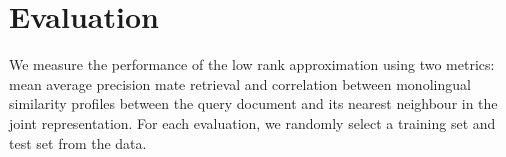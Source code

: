 \documentclass{article} %
\begin{document}
\begin{comment}
To investigate the empirical performance of the low rank
approximations we will test the algorithms on two large-scale,
real-world multilingual datasets: European Parliament Proceedings
Parallel Corpus v6 (EuroParl)\cite{europarl,euro_parl_web} and
Wikipedia~\cite{wikipedia}. Both sources offer a large number of
comparable documents in multiple languages.

EuroParl provides documents on legislation, regulations,
parliamentary sessions, etc.  in 21 of the EU languages and is a
\emph{gold standard} in terms of multi-lingual data: these
documents are professional translations of each other.  In the
corpus, each day is available as a separate file, although newer
data is available in smaller units. To create the document,
within each file, we create a document for each speech
ID\footnote{In the corpus, this is referred to as the speaker
  ID.}(so each speech is a document). In the end, the document
contains a document ID, a speech ID, and paragraph markup. The
documents were aligned in two ways: by speaker id and by
paragraphs.  The number of paragraphs was used only if the number
was the same for different languages.  In total, it contains
approximately 21000 documents in the 21 languages of the EU
taking up around 2GB od storage.

Wikipedia is the de-facto encyclopedia on the Internet and can be
downloaded freely. It contains 15 million articles in around 200
languages.The distribution of these articles is not uniform but
heavily biased towards a few languages. The top 3 languages
(English, German, French) contain more than 1 million articles;
the next 6 (Spanish, Italian, Dutch, Japanese, Polish, Portuguese
and Russian) contain more than 650,000 articles; down to Karuni
with 1 article. To make the two dataset comparable, we select the
same languages as above with a similar number of
documents\footnote{Of the chosen languages, Latvian had the
  fewest articles with 37,000 articles}.


\end{comment}

\section{Evaluation}
We measure the performance of the low rank approximation using
two metrics: mean average precision mate retrieval and
correlation between monolingual similarity profiles between the
query document and its nearest neighbour in the joint
representation. For each evaluation, we randomly select a
training set and test set from the data.
\end{document}
